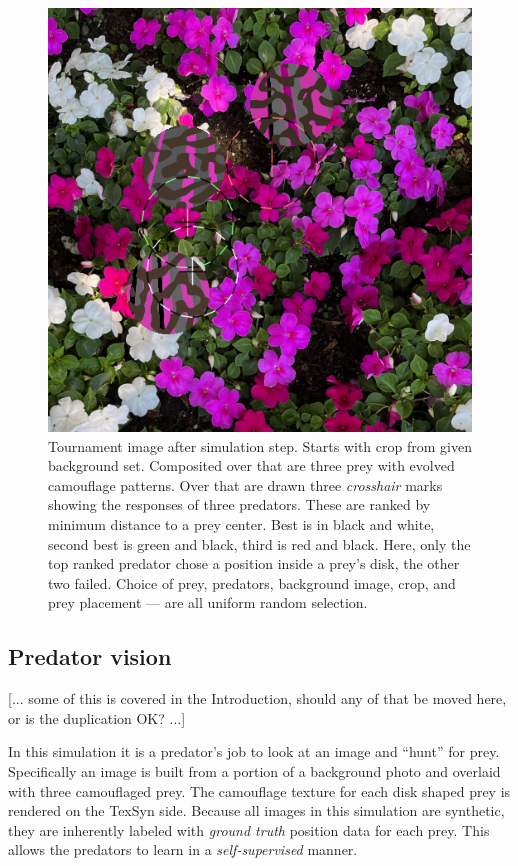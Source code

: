 \documentclass[sigconf]{acmart}
\newcommand{\jargon}[1]{\textit{#1}}
\begin{document}

\begin{figure}
    \includegraphics[width=\columnwidth]{images/20221007_0806_step_7030.png}
    \caption{Tournament image after simulation step. Starts with crop from given background set. Composited over that are three prey with evolved camouflage patterns. Over that are drawn three \jargon{crosshair} marks showing the responses of three predators. These are ranked by minimum distance to a prey center. Best is in black and white, second best is green and black, third is red and black. Here, only the top ranked predator chose a position inside a prey's disk, the other two failed. Choice of prey, predators, background image, crop, and prey placement — are all uniform random selection.}
    \label{fig:predator_responses}
\end{figure}


\subsection{Predator vision}
[... some of this is covered in the Introduction, should any of that be moved here, or is the duplication OK? ...]
\par
In this simulation it is a predator's job to look at an image and “hunt” for prey. Specifically an image is built from a portion of a background photo and overlaid with three camouflaged prey. The camouflage texture for each disk shaped prey is rendered on the TexSyn side. Because all images in this simulation are synthetic, they are inherently labeled with \jargon{ground truth} position data for each prey. This allows the predators to learn in a \jargon{self-supervised} manner.
\par
\end{document}
